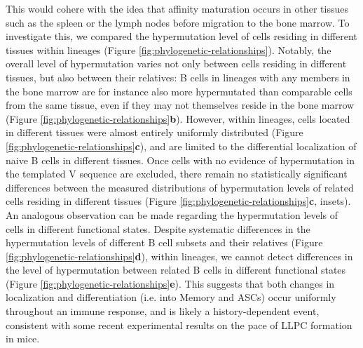 This would cohere with the idea that affinity maturation occurs in other tissues such as the spleen or the lymph nodes before migration to the bone marrow. To investigate this, we compared the hypermutation level of cells residing in different tissues within lineages (Figure \ref{fig:phylogenetic-relationships}). Notably, the overall level of hypermutation varies not only between cells residing in different tissues, but also between their relatives: B cells in lineages with any members in the bone marrow are for instance also more hypermutated than comparable cells from the same tissue, even if they may not themselves reside in the bone marrow (Figure \ref{fig:phylogenetic-relationships}\textbf{b}). However, within lineages, cells located in different tissues were almost entirely uniformly distributed (Figure \ref{fig:phylogenetic-relationships}\textbf{c}), and are limited to the differential localization of naive B cells in different tissues. Once cells with no evidence of hypermutation in the templated V sequence are excluded, there remain no statistically significant differences between the measured distributions of hypermutation levels of related cells residing in different tissues (Figure \ref{fig:phylogenetic-relationships}\textbf{c}, insets).  An analogous observation can be made regarding the hypermutation levels of cells in different functional states. Despite systematic differences in the hypermutation levels of  different B cell subsets and their relatives (Figure \ref{fig:phylogenetic-relationships}\textbf{d}), within lineages, we cannot detect differences in the level of hypermutation between related B cells in different functional states (Figure \ref{fig:phylogenetic-relationships}\textbf{e}). This suggests that both changes in localization and differentiation (i.e. into Memory and ASCs) occur uniformly throughout an immune response, and is likely a history-dependent event, consistent with some recent experimental results on the pace of LLPC formation in mice. 


